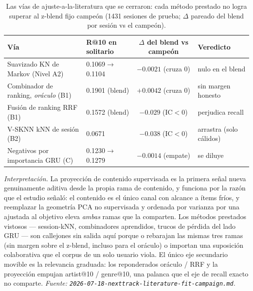 \documentclass[11pt]{article}
\begin{document}
\begin{table}[ht]
  \centering
  \caption{Las vías de ajuste-a-la-literatura que se cerraron: cada método
  prestado no logra superar al z-blend fijo campeón (\num{1431} sesiones de prueba;
  $\Delta$ pareado del blend por sesión vs el campeón).}
  \label{tab:projection-lanes}
  {\footnotesize\setlength{\tabcolsep}{5pt}\begin{tabular}{llcl}
    \toprule
    Vía & R@10 en solitario & $\Delta$ del blend vs campeón & Veredicto \\
    \midrule
    Suavizado KN de Markov (Nivel A2)      & 0.1069$\to$0.1104 & $-0.0021$ (cruza 0) & nulo en el blend \\
    Combinador de ranking, \emph{oráculo} (B1) & 0.1901 (blend) & $+0.0042$ (cruza 0) & sin margen honesto \\
    Fusión de ranking RRF (B1)             & 0.1572 (blend) & $-0.029$ (IC$<$0) & perjudica recall \\
    V-SKNN kNN de sesión (B2)              & 0.0671 & $-0.038$ (IC$<$0) & arrastra (solo cálidos) \\
    Negativos por importancia GRU (C)      & 0.1230$\to$0.1279 & $-0.0014$ (empate) & se diluye \\
    \bottomrule
  \end{tabular}}
\end{table}

\emph{Interpretación.} La proyección de contenido supervisada es la primera señal
nueva genuinamente aditiva desde la propia rama de contenido, y funciona por la
razón que el estudio señaló: el contenido es el único canal con alcance a ítems
fríos, y reemplazar la geometría PCA no supervisada y ordenada por varianza por una
ajustada al objetivo eleva \emph{ambas} ramas que la comparten. Los métodos
prestados vistosos --- session-kNN, combinadores aprendidos, trucos de pérdida del
lado GRU --- son callejones sin salida aquí porque o rebarajan las mismas tres
ramas (sin margen sobre el z-blend, incluso para el oráculo) o importan una
suposición colaborativa que el corpus de un solo usuario viola. El único eje
secundario movible es la relevancia graduada: los reponderados oráculo / RRF y la
proyección empujan artist@10 / genre@10, una palanca que el eje de recall exacto no
comparte.
\emph{Fuente: \texttt{2026-07-18-nexttrack-literature-fit-campaign.md}.}
\end{document}
